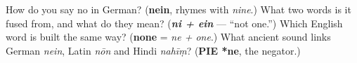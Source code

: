 \begin{tcolorbox}[breakable,colback=teal!4,colframe=teal!35!black,title={Before you move on}]
How do you say no in German? (\textbf{nein}, rhymes with \emph{nine}.) What two words is it fused from, and what do they mean? (\emph{\textbf{ni + ein}} — \textquotedblleft{}not one.\textquotedblright{}) Which English word is built the same way? (\textbf{none} = \emph{ne + one}.) What ancient sound links German \emph{nein}, Latin \emph{nōn} and Hindi \emph{nahīṃ}? (\textbf{PIE *ne}, the negator.)
\end{tcolorbox}

